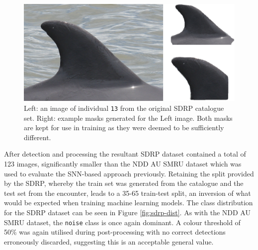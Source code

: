 \begin{figure}
	\begin{center}
		\includegraphics[scale=0.5]{Chapter7/figs/SDRP-double-mask-eg-indv-13.png}
	\end{center}
	\caption[Left: an image of individual \texttt{13} from the original SDRP catalogue set. Right: example masks generated for the Left image.]{Left: an image of individual \texttt{13} from the original SDRP catalogue set. Right: example masks generated for the Left image. Both masks are kept for use in training as they were deemed to be sufficiently different.}
	\label{fig:sdrp-double-mask-eg}
\end{figure}

After detection and processing the resultant SDRP dataset contained a total of 123 images, significantly smaller than the NDD AU SMRU dataset which was used to evaluate the SNN-based approach previously. Retaining the split provided by the SDRP, whereby the train set was generated from the catalogue and the test set from the encounter, leads to a 35-65 train-test split, an inversion of what would be expected when training machine learning models. The class distribution for the SDRP dataset can be seen in Figure \ref{fig:sdrp-dist}. As with the NDD AU SMRU dataset, the \texttt{noise} class is once again dominant. A colour threshold of 50\% was again utilised during post-processing with no correct detections erroneously discarded, suggesting this is an acceptable general value.

